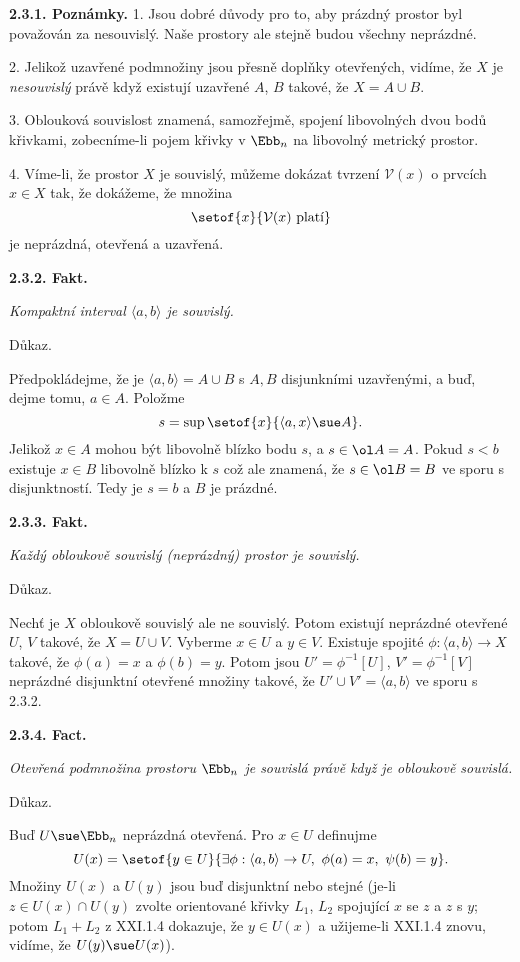 \documentclass[12pt]{article}
\begin{document}
\medskip

{\bf 2.3.1. Poznámky.} 1. Jsou dobré důvody pro to, aby prázdný prostor byl považován za nesouvislý. Naše prostory ale stejně budou všechny neprázdné.

2. Jelikož uzavřené podmnožiny jsou přesně doplňky otevřených, vidíme, že
$X$ je {\em nesouvislý} právě když existují uzavřené $A$, $B$ takové, že $X=A\cup B$.

3. Oblouková souvislost znamená, samozřejmě, spojení libovolných dvou bodů křivkami, zobecníme-li pojem křivky  v $\Ebb_n$ na libovolný metrický prostor.

4. Víme-li, že prostor  $X$ je souvislý, můžeme dokázat tvrzení $\mathcal V(x)$ o prvcích $x\in X$ tak, že dokážeme, že množina
$$
\setof{x}{\mathcal V(x)\ \text{platí}}
$$
je neprázdná, otevřená a uzavřená.

\medskip

{\bf 2.3.2. Fakt.} {\em Kompaktní interval $\langle a,b\rangle$ je souvislý.

Důkaz.} Předpokládejme, že je $\langle a,b\rangle=A\cup B$ s $A,B$ disjunkními uzavřenými, a buď, dejme tomu, $a\in A$. Položme
$$
s=\sup\setof{x}{\langle a,x\rangle\sue A}.
$$
Jelikož  $x\in A$ mohou být libovolně blízko bodu $s$, a $s\in\ol A=A$. Pokud $s<b$ existuje $x\in B$ libovolně blízko k $s$ což ale  znamená, že $s\in\ol B=B$ ve sporu s disjunktností. Tedy je $s=b$ a $B$ je prázdné.\sq

\medskip

{\bf 2.3.3. Fakt.} {\em Každý obloukově souvislý (neprázdný) prostor je souvislý.

Důkaz.} Nechť je $X$ obloukově souvislý ale ne souvislý. Potom existují
neprázdné otevřené $U$, $V$ takové, že $X=U\cup V$. Vyberme $x\in U$ a $y\in V$. Existuje spojité $\phi:\langle a,b\rangle\to X$ takové, že $\phi(a)=x$ a
$\phi(b)=y$. Potom jsou $U'=\phi^{-1}[U]$, $V'=\phi^{-1}[V]$ neprázdné disjunktní otevřené množiny takové, že $U'\cup V'=\langle a,b\rangle$ ve sporu s 2.3.2. \sq

\medskip

{\bf 2.3.4. Fact.} {\em Otevřená podmnožina prostoru $\Ebb_n$ je souvislá právě když je obloukově souvislá.

Důkaz.} Buď $U\sue\Ebb_n$ neprázdná otevřená. Pro $x\in U$ definujme
$$
U(x)=\setof{y\in U}{\exists \phi:\langle a,b\rangle\to U,\ \phi(a)=x,\ \psi(b)=y}.
$$
Množiny $U(x)$ a $U(y)$ jsou buď disjunktní nebo stejné (je-li $z\in U(x)\cap U(y)$ zvolte orientované křivky $L_1$, $L_2$ spojující $x$ se $z$ a $z$ s $y$; potom $L_1+L_2$ z XXI.1.4 dokazuje, že $y\in U(x)$ a užijeme-li XXI.1.4  znovu, vidíme, že
$U(y)\sue U(x)$).
\end{document}
